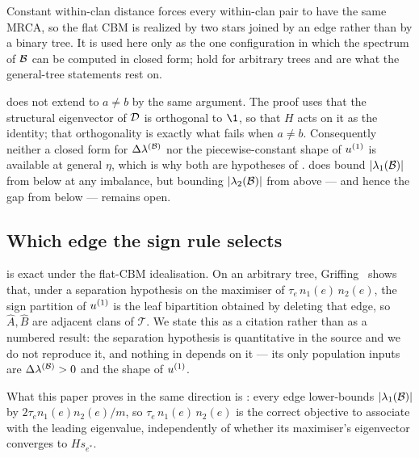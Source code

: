 \begin{remark}\label{rem:flat-realization}
Constant within-clan distance forces every within-clan pair to have the same
MRCA, so the flat CBM is realized by two stars joined by an edge rather than by a
binary tree. It is used here only as the one configuration in which the spectrum
of $\mathcal{B}$ can be computed in closed form; 
hold for arbitrary trees and are what the general-tree statements rest on.
\end{remark}

\begin{remark}\label{rem:G-unbalanced}
 does not extend to $a\ne b$ by the same argument. The
proof uses that the structural eigenvector of $\mathcal{D}$ is orthogonal to $\1$, so
that $H$ acts on it as the identity; that orthogonality is exactly what fails
when $a\ne b$. Consequently neither a closed form for $\Delta\lambda^{(\mathcal{B})}$ nor the
piecewise-constant shape of $u^{(1)}$ is available at general $\eta$, which is why
both are hypotheses of .  does bound
$|\lambda_1(\mathcal{B})|$ from below at any imbalance, but bounding
$|\lambda_2(\mathcal{B})|$ from above --- and hence the gap from below --- remains open.
\end{remark}

\subsection{Which edge the sign rule selects}\label{app:dist-partition}

 is exact under the flat-CBM idealisation. On an arbitrary
tree, Griffing~\cite[Ch.~4]{Griffing2012} shows that, under a separation
hypothesis on the maximiser of $\tau_e\,n_1(e)\,n_2(e)$, the sign partition of
$u^{(1)}$ is the leaf bipartition obtained by deleting that edge, so
$\widehat A,\widehat B$ are adjacent clans of $\mathcal T$. We state this as a
citation rather than as a numbered result: the separation hypothesis is
quantitative in the source and we do not reproduce it, and nothing in
 depends on it --- its only population inputs are
$\Delta\lambda^{(\mathcal{B})}>0$ and the shape of $u^{(1)}$.

What this paper proves in the same direction is : every edge
lower-bounds $|\lambda_1(\mathcal{B})|$ by $2\tau_e n_1(e)n_2(e)/m$, so
$\tau_e\,n_1(e)\,n_2(e)$ is the correct objective to associate with the leading
eigenvalue, independently of whether its maximiser's eigenvector converges to
$Hs_{e^*}$.

